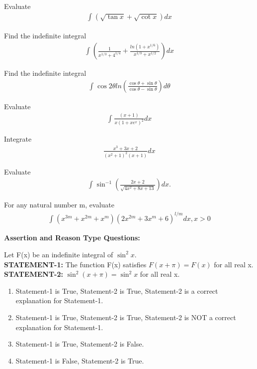 \item Evaluate 
\begin{align*}
\int_{}(\sqrt{\tan x} + \sqrt{\cot x})dx
\end{align*}

\item Find the indefinite integral
\begin{align*}
\int_{}(\frac{1}{x^{1/3} + 4^{1/4}} + \frac{ln(1 + x^{1/6})}{x^{1/3} + x^{1/2}})dx
\end{align*}

\item Find the indefinite integral
\begin{align*}
\int_{}\cos 2\theta ln(\frac{\cos \theta + \sin \theta}{\cos \theta - \sin \theta})d\theta
\end{align*}

\item Evaluate 
\begin{align*}
\int_{}\frac{(x + 1)}{x(1 + xe^x)^2}dx
\end{align*}

\item Integrate 
\begin{align*}
\frac{x^3 + 3x + 2}{(x^2 + 1)^2(x + 1)}dx
\end{align*}

\item Evaluate
\begin{align*}
\int_{}\sin^{-1}(\frac{2x + 2}{\sqrt{4x^2 + 8x + 13}})dx.
\end{align*}

\item For any natural number m, evaluate
\begin{align*}
\int_{}(x^{3m} + x^{2m} + x^{m})(2x^{2m} + 3x^m + 6)^{l/m}dx, x > 0
\end{align*}

\textbf{Assertion and Reason Type Questions:}

\item Let F(x) be an indefinite integral of $\sin^{2}x$.\\
\textbf{STATEMENT-1:} The function F(x) satisfies $F(x + \pi) = F(x)$ for all real x.\\
\textbf{STATEMENT-2:} $\sin^{2}(x + \pi) = \sin^{2}x$ for all real x.
\begin{enumerate}
\item Statement-1 is True, Statement-2 is True, Statement-2 is a correct explanation for Statement-1.
\item Statement-1 is True, Statement-2 is True, Statement-2 is NOT a correct explanation for Statement-1.
\item Statement-1 is True, Statement-2 is False.
\item Statement-1 is False, Statement-2 is True.
\end{enumerate}

